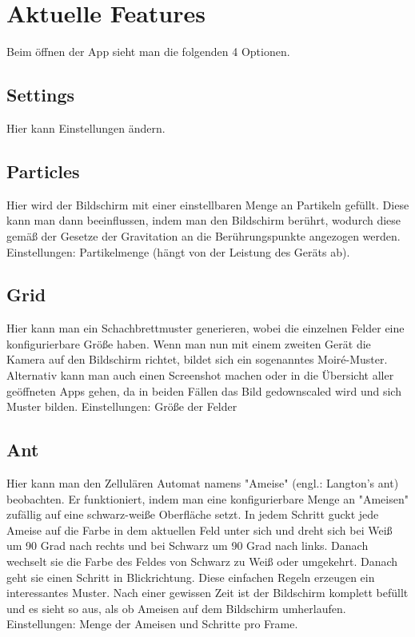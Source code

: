 \documentclass[8pt, letterpaper]{article}
\begin{document}
\section{Aktuelle Features}
Beim öffnen der App sieht man die folgenden 4 Optionen.

\subsection{Settings}
Hier kann Einstellungen ändern.

\subsection{Particles}
Hier wird der Bildschirm mit einer einstellbaren Menge an Partikeln gefüllt. Diese kann man dann beeinflussen, indem man den Bildschirm berührt, wodurch diese gemäß der Gesetze der Gravitation an die Berührungspunkte angezogen werden.
Einstellungen: Partikelmenge (hängt von der Leistung des Geräts ab).

\subsection{Grid}
Hier kann man ein Schachbrettmuster generieren, wobei die einzelnen Felder eine konfigurierbare Größe haben. Wenn man nun mit einem zweiten Gerät die Kamera auf den Bildschirm richtet, bildet sich ein sogenanntes Moiré-Muster. Alternativ kann man auch einen Screenshot machen oder in die Übersicht aller geöffneten Apps gehen, da in beiden Fällen das Bild gedownscaled wird und sich Muster bilden.
Einstellungen: Größe der Felder

\subsection{Ant}
Hier kann man den Zellulären Automat namens "Ameise" (engl.: Langton's ant) beobachten. Er funktioniert, indem man eine konfigurierbare Menge an "Ameisen" zufällig auf eine schwarz-weiße Oberfläche setzt. In jedem Schritt guckt jede Ameise auf die Farbe in dem aktuellen Feld unter sich und dreht sich bei Weiß um 90 Grad nach rechts und bei Schwarz um 90 Grad nach links. Danach wechselt sie die Farbe des Feldes von Schwarz zu Weiß oder umgekehrt. Danach geht sie einen Schritt in Blickrichtung. Diese einfachen Regeln erzeugen ein interessantes Muster. Nach einer gewissen Zeit ist der Bildschirm komplett befüllt und es sieht so aus, als ob Ameisen auf dem Bildschirm umherlaufen.
Einstellungen: Menge der Ameisen und Schritte pro Frame.
\end{document}
